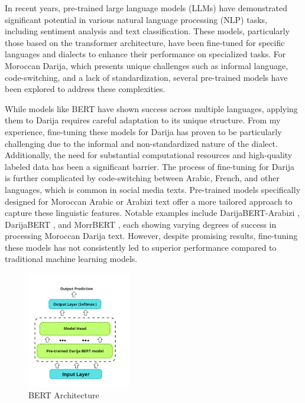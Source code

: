 \documentclass[a4paper,40pt,twocolumn]{article}
\begin{document}
In recent years, pre-trained large language models (LLMs) have demonstrated significant potential in various natural language processing (NLP) tasks, including sentiment analysis and text classification. These models, particularly those based on the transformer architecture, have been fine-tuned for specific languages and dialects to enhance their performance on specialized tasks. For Moroccan Darija, which presents unique challenges such as informal language, code-switching, and a lack of standardization, several pre-trained models have been explored to address these complexities.

While models like BERT have shown success across multiple languages, applying them to Darija requires careful adaptation to its unique structure. From my experience, fine-tuning these models for Darija has proven to be particularly challenging due to the informal and non-standardized nature of the dialect. Additionally, the need for substantial computational resources and high-quality labeled data has been a significant barrier. The process of fine-tuning for Darija is further complicated by code-switching between Arabic, French, and other languages, which is common in social media texts. Pre-trained models specifically designed for Moroccan Arabic or Arabizi text offer a more tailored approach to capture these linguistic features. Notable examples include DarijaBERT-Arabizi \cite{darijabert}, DarijaBERT \cite{darijabert}, and MorrBERT \cite{morrbert}, each showing varying degrees of success in processing Moroccan Darija text. However, despite promising results, fine-tuning these models has not consistently led to superior performance compared to traditional machine learning models.

\begin{figure}[H]
    \centering
    \includegraphics[width=0.4\textwidth]{bert.png}
    \caption{BERT Architecture}
    \label{fig:BERT ARCHI}
\end{figure}
\end{document}
